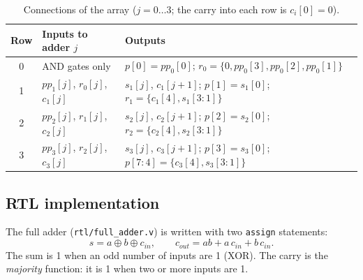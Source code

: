 \documentclass[10pt,a4paper,twocolumn]{article}
\begin{document}
\begin{table}[!htbp]
\centering\footnotesize
\begin{tabularx}{\columnwidth}{c>{\raggedright\arraybackslash}p{2.6cm}L}
\toprule
\textbf{Row} & \textbf{Inputs to adder $j$} & \textbf{Outputs} \\
 & AND gates only & $p[0] = pp_0[0]$; $r_0 = \{0, pp_0[3], pp_0[2], pp_0[1]\}$ \\
1 & $pp_1[j]$, $r_0[j]$, $c_1[j]$ & $s_1[j]$, $c_1[j{+}1]$; $p[1] = s_1[0]$; $r_1 = \{c_1[4], s_1[3{:}1]\}$ \\
2 & $pp_2[j]$, $r_1[j]$, $c_2[j]$ & $s_2[j]$, $c_2[j{+}1]$; $p[2] = s_2[0]$; $r_2 = \{c_2[4], s_2[3{:}1]\}$ \\
3 & $pp_3[j]$, $r_2[j]$, $c_3[j]$ & $s_3[j]$, $c_3[j{+}1]$; $p[3] = s_3[0]$; $p[7{:}4] = \{c_3[4], s_3[3{:}1]\}$ \\
\bottomrule
\end{tabularx}
\caption{Connections of the array ($j = 0\ldots3$; the carry into each row is $c_i[0] = 0$).}
\label{tab:conn}
\end{table}

\subsection{RTL implementation}
The full adder (\texttt{rtl/full\_adder.v}) is written with two \texttt{assign} statements:
\begin{equation*}
s = a \oplus b \oplus c_{in}, \qquad c_{out} = ab + a\,c_{in} + b\,c_{in}.
\end{equation*}
The sum is 1 when an odd number of inputs are 1 (XOR). The carry is the \emph{majority} function: it is 1 when two or more inputs are 1.
\end{document}
